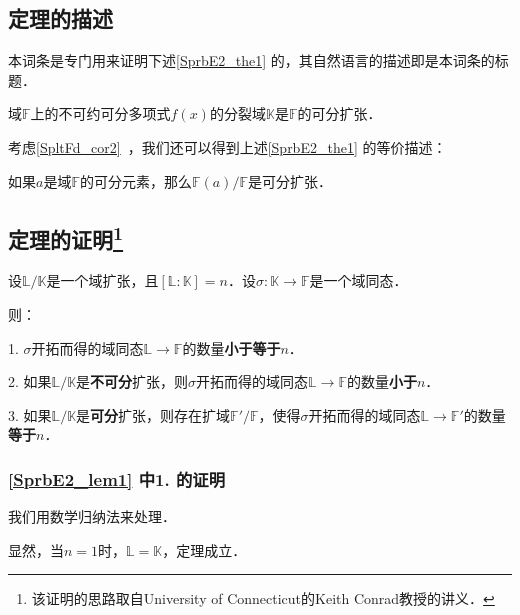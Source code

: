 

\subsection{定理的描述}

本词条是专门用来证明下述\autoref{SprbE2_the1} 的，其自然语言的描述即是本词条的标题．

\begin{theorem}{}\label{SprbE2_the1}
域$\mathbb{F}$上的不可约可分多项式$f(x)$的分裂域$\mathbb{K}$是$\mathbb{F}$的可分扩张．
\end{theorem}

考虑\autoref{SpltFd_cor2}~，我们还可以得到上述\autoref{SprbE2_the1} 的等价描述：

\begin{theorem}{}
如果$a$是域$\mathbb{F}$的可分元素，那么$\mathbb{F}(a)/\mathbb{F}$是可分扩张．
\end{theorem}



\subsection{定理的证明\footnote{该证明的思路取自University of Connecticut的Keith Conrad教授的讲义．}}

\begin{lemma}{}\label{SprbE2_lem1}
设$\mathbb{L}/\mathbb{K}$是一个域扩张，且$[\mathbb{L}:\mathbb{K}]=n$．设$\sigma:\mathbb{K}\to\mathbb{F}$是一个域同态．

则：

1. $\sigma$开拓而得的域同态$\mathbb{L}\to\mathbb{F}$的数量\textbf{小于等于}$n$．

2. 如果$\mathbb{L}/\mathbb{K}$是\textbf{不可分}扩张，则$\sigma$开拓而得的域同态$\mathbb{L}\to\mathbb{F}$的数量\textbf{小于}$n$．

3. 如果$\mathbb{L}/\mathbb{K}$是\textbf{可分}扩张，则存在扩域$\mathbb{F}'/\mathbb{F}$，使得$\sigma$开拓而得的域同态$\mathbb{L}\to\mathbb{F}'$的数量\textbf{等于}$n$．

\end{lemma}




\subsubsection{\autoref{SprbE2_lem1} 中1. 的证明}

我们用数学归纳法来处理．

显然，当$n=1$时，$\mathbb{L}=\mathbb{K}$，定理成立．


















